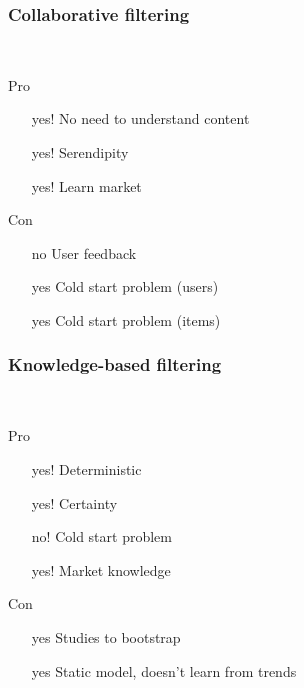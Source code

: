\begin{frame}[t]
  \frametitle{Collaborative filtering}
  \textit{}\\
  \textit{}

  Pro
  \begin{itemize}
  \item [yes!] No need to understand content
  \item [yes!] Serendipity
  \item [yes!] Learn market
  \end{itemize}

  \bigskip
  Con
  \begin{itemize}
  \item [no] User feedback
  \item [yes] Cold start problem (users)
  \item [yes] Cold start problem (items)
  \end{itemize}
\end{frame}

\begin{frame}[t]
  \frametitle{Knowledge-based filtering}
  \textit{}\\
  \textit{}

  Pro
  \begin{itemize}
  \item [yes!] Deterministic
  \item [yes!] Certainty
  \item [no!] Cold start problem
  \item [yes!] Market knowledge
  \end{itemize}

  \bigskip
  Con
  \begin{itemize}
  \item [yes] Studies to bootstrap
  \item [yes] Static model, doesn't learn from trends
  \end{itemize}
\end{frame}



